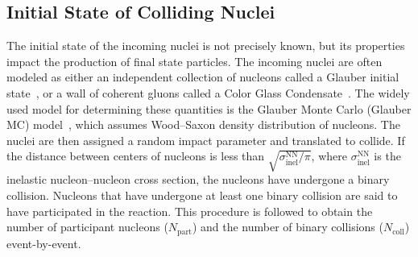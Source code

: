 \subsection{Initial State of Colliding Nuclei}
The initial state of the incoming nuclei is not precisely known, but its properties impact the production of final state particles.  
%
The incoming nuclei are often modeled as either an independent collection of nucleons called a Glauber initial state~\cite{Miller:2007ri}, or a wall of coherent gluons called a Color Glass Condensate~\cite{IANCU2001583}. 
%
The widely used model for determining these quantities is the Glauber Monte Carlo (Glauber MC) model~\cite{Loizides_2015}, which assumes Wood–Saxon density distribution of nucleons.
%
The nuclei are then assigned a random impact parameter and translated to collide. 
%
If the distance between centers of nucleons is less than \(\sqrt{\sigma_\mathrm{inel}^\mathrm{NN}/\pi}\), where \(\sigma_\mathrm{inel}^\mathrm{NN}\) is the inelastic nucleon–nucleon cross section, the nucleons have undergone a binary collision. 
%
Nucleons that have undergone at least one binary collision are said to have participated in the reaction.
%
This procedure is followed to obtain the number of participant nucleons (\(N_\mathrm{part}\)) and the number of binary collisions (\(N_\mathrm{coll}\)) event-by-event.

